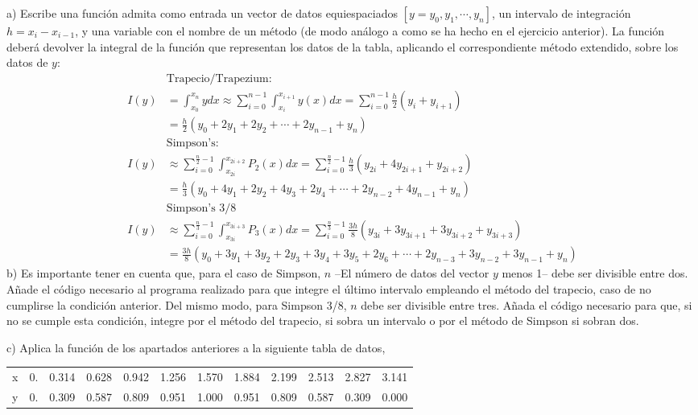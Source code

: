 a) Escribe una función admita como entrada un vector de datos equiespaciados $[y= y_0,y_1,\cdots,y_n]$, un intervalo de integración $h=x_i - x_{i-1}$, y una variable con el nombre de un método (de modo análogo a como se ha hecho en el ejercicio anterior). La función deberá devolver la integral de la función que representan los datos de la tabla, aplicando el correspondiente método extendido, sobre los datos de $y$:
\begin{align*}
 &\text{Trapecio/Trapezium:}\\
I(y)&=\int_{x_0}^{x_n}ydx \approx \sum_{i=0}^{n-1}\int_{x_i}^{x_{i+1}}y(x)dx=\sum_{i=0}^{n-1}\frac{h}{2}(y_i+y_{i+1})\\
&=\frac{h}{2}\left(y_0+2y_1+2y_2+\cdots+2y_{n-1}+y_n \right)\\
 &\text{Simpson's:} \\
I(y)&\approx \sum_{i=0}^{\frac{n}{2}-1}\int_{x_{2i}}^{x_{2i+2}}P_2(x)dx=\sum_{i=0}^{\frac{n}{2}-1}\frac{h}{3}(y_{2i}+4y_{2i+1}+y_{2i+2})\\
&= \frac{h}{3}(y_0+4y_1+2y_2+4y_3+2y_4+\cdots + 2y_{n-2}+4y_{n-1}+y_n)\\
&\text{Simpson's 3/8}\\
I(y)&\approx \sum_{i=0}^{\frac{n}{3}-1}\int_{x_{3i}}^{x_{3i+3}}P_3(x)dx=\sum_{i=0}^{\frac{n}{3}-1}\frac{3h}{8}(y_{3i}+3y_{3i+1}+3y_{3i+2}+y_{3i+3})\\
&= \frac{3h}{8}(y_0+3y_1+3y_2+2y_3+3y_4+3y_5+2y_6+ \cdots + 2y_{n-3}+3y_{n-2}+3y_{n-1}+y_n)
\end{align*}
 b) Es importante tener en cuenta que, para el caso de Simpson, $n$ --El número de datos del vector $y$ menos 1-- debe ser divisible entre dos. Añade el código necesario al programa realizado para que integre el último intervalo empleando el método del trapecio, caso de no cumplirse la condición anterior. Del mismo modo, para Simpson 3/8, $n$ debe ser divisible entre tres. Añada el código necesario para que, si no se cumple esta condición, integre por el método del trapecio, si sobra un intervalo o por el método de Simpson si sobran dos.

c) Aplica la función de los apartados anteriores a la siguiente tabla de datos,

\begin{tabular}{r r r r r r r r r r r r}
\hline
x & 0. &0.314 & 	0.628 &	0.942 &	1.256 &	1.570 &	1.884 &	 2.199 &	2.513 &	 2.827 &	3.141\\
y & 0. &0.309 &	0.587 &	0.809 &	0.951 &	1.000 &	0.951 &    0.809 &	0.587 &	0.309 &	0.000\\
\hline
\end{tabular}

